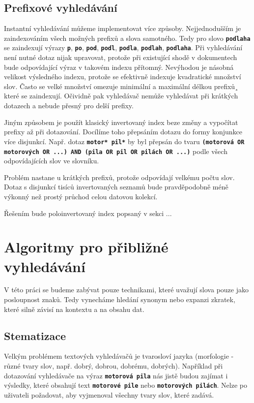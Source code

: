 \documentclass[11pt,letterpaper,oneside,openright]{book}
\newcommand{\bftt}[1]{\texttt{\textbf{#1}}}
\begin{document}
\subsection{Prefixové vyhledávání} \label{sec:prefix_search}
Instantní vyhledávání můžeme implementovat více způsoby. Nejjednodušším je
zaindexováním všech možných prefixů a slova samotného. Tedy pro slovo
\bftt{podlaha} se zaindexují výrazy \bftt{p}, \bftt{po}, \bftt{pod},
\bftt{podl}, \bftt{podla}, \bftt{podlah}, \bftt{podlaha}. Při vyhledávání není
nutné dotaz nijak upravovat, protože při existující shodě v dokumentech bude
odpovídající výraz v takovém indexu přítomný. Nevýhodou je násobná velikost
výsledného indexu, protože se efektivně indexuje kvadratické množství slov.
Často se velké množství omezuje minimální a maximální délkou prefixů¸ které se
zaindexují.  Očividně pak vyhledávač nemůže vyhledávat při krátkých dotazech a
nebude přesný pro delší prefixy.

Jiným způsobem je použít klasický invertovaný index beze změny a vypočítat
prefixy až při dotazování.  Docílíme toho přepsáním dotazu do formy konjunkce
více disjunkcí. Např. dotaz \bftt{motor* pil*} by byl přepsán do tvaru
\bftt{(motorová OR motorových OR ...) AND (pila OR pil OR pilách OR ...)} podle
všech odpovídajících slov ve slovníku.

Problém nastane u krátkých prefixů, protože odpovídají velkému počtu slov.
Dotaz s disjunkcí tisíců invertovaných seznamů bude pravděpodobně méně výkonný
než prostý průchod celou datovou kolekcí.

Řešením bude poloinvertovaný index popsaný v sekci ...

\section{Algoritmy pro přibližné vyhledávání}
V této práci se budeme zabývat pouze technikami, které uvažují slova pouze jako
posloupnost znaků. Tedy vynecháme hledání synonym nebo expanzi zkratek, které
silně závisí na kontextu a na obsahu dat.

\subsection{Stematizace}
Velkým problémem textových vyhledávačů je tvarosloví jazyka (morfologie - různé
tvary slov, např. dobrý, dobrou, dobrému, dobrých).  Například při dotazování
vyhledávače na výraz \bftt{motorová pila} nás jistě budou zajímat i výsledky,
které obsahují text \bftt{motorové pile} nebo \bftt{motorových pilách}. Nelze
po uživateli požadovat, aby vyjmenoval všechny tvary slov, které zadává.
\end{document}
